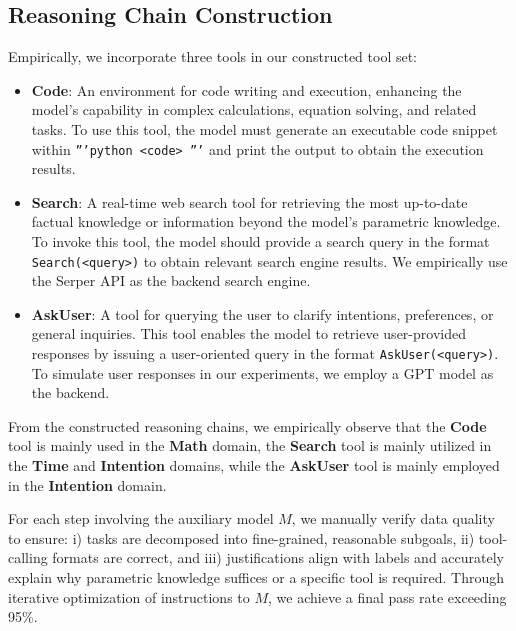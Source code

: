 \subsection{Reasoning Chain Construction}
\label{apdx:chain_construction}
Empirically, we incorporate three tools in our constructed tool set:
\begin{itemize}[topsep=2pt, partopsep=-5pt, leftmargin=8pt, itemsep=-4.5pt]
\item \textbf{Code}: An environment for code writing and execution, enhancing the model’s capability in complex calculations, equation solving, and related tasks. To use this tool, the model must generate an executable code snippet within \texttt{'''python <code> '''} and print the output to obtain the execution results.
\item \textbf{Search}: A real-time web search tool for retrieving the most up-to-date factual knowledge or information beyond the model’s parametric knowledge. To invoke this tool, the model should provide a search query in the format \texttt{Search(<query>)} to obtain relevant search engine results. We empirically use the Serper API as the backend search engine.
\item \textbf{AskUser}: A tool for querying the user to clarify intentions, preferences, or general inquiries. This tool enables the model to retrieve user-provided responses by issuing a user-oriented query in the format \texttt{AskUser(<query>)}. To simulate user responses in our experiments, we employ a GPT model as the backend.
\end{itemize}
From the constructed reasoning chains, we empirically observe that the \textbf{Code} tool is mainly used in the \textbf{Math} domain, the \textbf{Search} tool is mainly utilized in the \textbf{Time} and \textbf{Intention} domains, while the \textbf{AskUser} tool is mainly employed in the \textbf{Intention} domain.

For each step involving the auxiliary model \( M \), we manually verify data quality to ensure: i) tasks are decomposed into fine-grained, reasonable subgoals, ii) tool-calling formats are correct, and iii) justifications align with labels and accurately explain why parametric knowledge suffices or a specific tool is required. Through iterative optimization of instructions to \( M \), we achieve a final pass rate exceeding 95\%.

